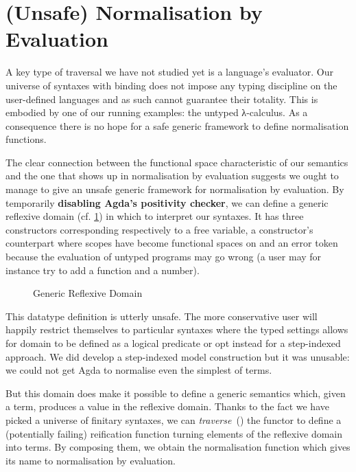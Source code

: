 \section{(Unsafe) Normalisation by Evaluation}\label{section:unsafenbyeval}

A key type of traversal we have not studied yet is a language's
evaluator. Our universe of syntaxes with binding does not impose
any typing discipline on the user-defined languages and as such
cannot guarantee their totality. This is embodied by one of our running
examples: the untyped λ-calculus. As a consequence there
is no hope for a safe generic framework to define normalisation
functions.

The clear connection between the  functional space
characteristic of our semantics and the one that shows up in
normalisation by evaluation suggests we ought to manage to
give an unsafe generic framework for normalisation by evaluation.
By temporarily \textbf{disabling Agda's positivity checker},
we can define a generic reflexive domain 
(cf. \cref{fig:reflexivedomain}) in which to
interpret our syntaxes. It has three constructors corresponding
respectively to a free variable, a constructor's counterpart where
scopes have become  functional spaces on  and
an error token because the evaluation of untyped programs may go wrong
(a user may for instance try to add a function and a number).

\begin{figure}[h]
\caption{Generic Reflexive Domain}\label{fig:reflexivedomain}
\end{figure}

This datatype definition is utterly unsafe. The more conservative
user will happily restrict themselves to particular syntaxes where
the typed settings allows for domain to be defined as a logical
predicate or opt instead for a step-indexed approach. We did develop
a step-indexed model construction but it was unusable: we could not
get Agda to normalise even the simplest of terms.

But this domain does make it possible to define a generic 
semantics which, given a term, produces a value in the reflexive
domain. Thanks to the fact we have picked a universe of finitary syntaxes, we
can \emph{traverse}~(\cite{mcbride_paterson_2008,DBLP:journals/jfp/GibbonsO09})
the functor to define
a (potentially failing) reification function turning elements of the
reflexive domain into terms. By composing them, we obtain the
normalisation function which gives its name to normalisation by
evaluation.

